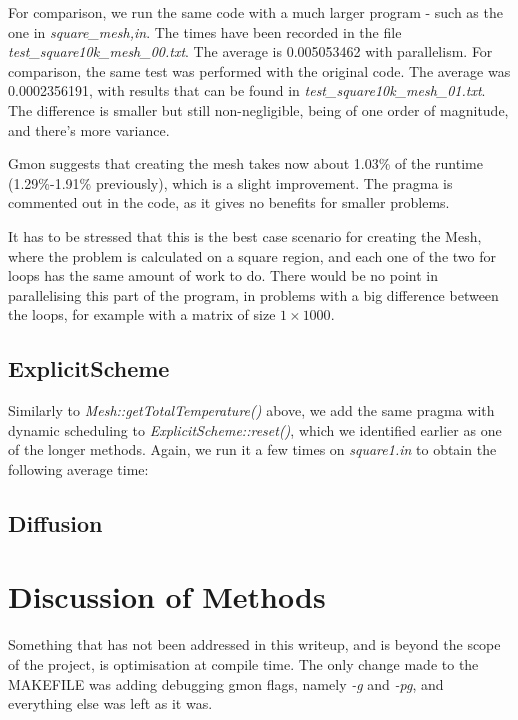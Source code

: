 \documentclass[11pt,journal]{IEEEtran}
\begin{document}
	For comparison, we run the same code with a much larger program - such as the one in \emph{square\_mesh,in}. The times have been recorded in the file \emph{test\_square10k\_mesh\_00.txt}. The average is 0.005053462 with parallelism. For comparison, the same test was performed with the original code. The average was 0.0002356191, with results that can be found in \emph{test\_square10k\_mesh\_01.txt}. The difference is smaller but still non-negligible, being of one order of magnitude, and there's more variance.
	
	Gmon suggests that creating the mesh takes now about 1.03\% of the runtime (1.29\%-1.91\% previously), which is a slight improvement. The pragma is commented out in the code, as it gives no benefits for smaller problems.
	
	
	
	

	It has to be stressed that this is the best case scenario for creating the Mesh, where the problem is calculated on a square region, and each one of the two for loops has the same amount of work to do. There would be no point in parallelising this part of the program, in problems with a big difference between the loops, for example with a matrix of size $1 \times 1000$.
	
	\subsection{ExplicitScheme}
	
	Similarly to \emph{Mesh::getTotalTemperature()} above, we add the same pragma with dynamic scheduling to \emph{ExplicitScheme::reset()}, which we identified earlier as one of the longer methods. Again, we run it a few times on \emph{square1.in} to obtain the following average time:
	
	\subsection{Diffusion}

	
	\section{Discussion of Methods}
	Something that has not been addressed in this writeup, and is beyond the scope of the project, is optimisation at compile time. The only change made to the MAKEFILE was adding debugging gmon flags, namely \emph{-g} and \emph{-pg}, and everything else was left as it was.
	
\end{document}

